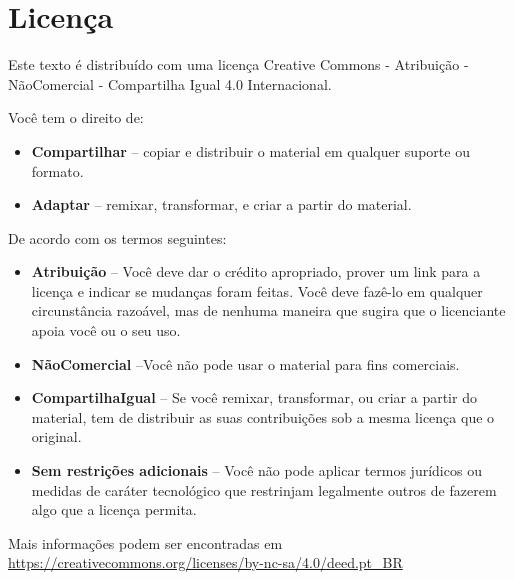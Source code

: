 \documentclass{article}
\begin{document}
\section{Licença}

Este texto é distribuído com uma licença Creative Commons - Atribuição - NãoComercial - Compartilha Igual 4.0 Internacional.


Você tem o direito de:
\begin{itemize}
\item \textbf{Compartilhar} -- copiar e distribuir o material em qualquer suporte ou formato.
\item \textbf{Adaptar} -- remixar, transformar, e criar a partir do material.
\end{itemize}

De acordo com os termos seguintes:
\begin{itemize}
\item \textbf{Atribuição} -- Você deve dar o crédito apropriado, prover um link para a licença e indicar se mudanças foram feitas. Você deve fazê-lo em qualquer circunstância razoável, mas de nenhuma maneira que sugira que o licenciante apoia você ou o seu uso.
\item \textbf{NãoComercial} --Você não pode usar o material para fins comerciais.
\item \textbf{CompartilhaIgual} -- Se você remixar, transformar, ou criar a partir do material, tem de distribuir as suas contribuições sob a mesma licença que o original.
\item \textbf{Sem restrições adicionais} -- Você não pode aplicar termos jurídicos ou medidas de caráter tecnológico que restrinjam legalmente outros de fazerem algo que a licença permita.
\end{itemize}

Mais informações podem ser encontradas em \url{https://creativecommons.org/licenses/by-nc-sa/4.0/deed.pt_BR}
\end{document}
